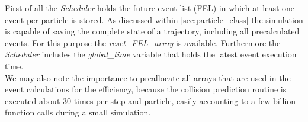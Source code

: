 First of all the \textit{Scheduler} holds the future event list (FEL) in which at least one event per particle is stored. As discussed within \autoref{sec:particle_class} the simulation is capable of saving the complete state of a trajectory, including all precalculated events. For this purpose the \textit{reset\_FEL\_array} is available. Furthermore the \textit{Scheduler} includes the \textit{global\_time} variable that holds the latest event execution time.\\

We may also note the importance to preallocate all arrays that are used in the event calculations for the efficiency, because the collision prediction routine is executed about 30 times per step and particle, easily accounting to a few billion function calls during a small simulation.

